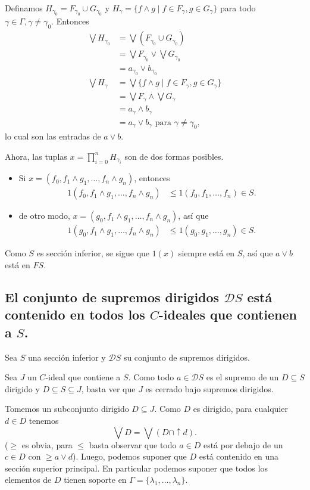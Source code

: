 \documentclass[12pt,letterpaper,titlepage]{article}
\theoremstyle{definition}
\renewcommand\sup{\vee}
\newcommand\Sup{\bigvee}
\renewcommand\inf{\wedge}
\newcommand\D{\mathcal D}
\newcommand\tps[2]{\texorpdfstring{#1}{#2}}
\newcommand\<{\langle}
\renewcommand\>{\rangle}
\begin{document}
Definamos $H_{\gamma_0}=F_{\gamma_0}\cup G_{\gamma_0}$ y
$H_\gamma = \{f\inf g\mid f\in F_\gamma,g\in G_\gamma\}$ para
todo $\gamma\in\Gamma,\gamma\neq\gamma_0$.
Entonces
\begin{align*}
  \Sup H_{\gamma_0}
  &= \Sup(F_{\gamma_0}\cup G_{\gamma_0}) \\
  &= \Sup F_{\gamma_0} \sup \Sup G_{\gamma_0} \\
  &= a_{\gamma_0} \sup b_{\gamma_0}
  \\
  \Sup H_\gamma
  &= \Sup\{f\inf g \mid f\in F_\gamma, g\in G_\gamma\} \\
  &= \Sup F_\gamma \inf \Sup G_\gamma \\
  &= a_\gamma \inf b_\gamma \\
  &= a_\gamma\sup b_\gamma
  \text{ para } \gamma\neq\gamma_0,
\end{align*}
lo cual son las entradas de $a\sup b$.

Ahora, las tuplas $x=\prod_{i=0}^n H_{\gamma_i}$ son de
dos formas posibles.
\begin{itemize}
  \item Si $x=(f_0,f_1\inf g_1,\dots,f_n\inf g_n)$,
  entonces
  \begin{align*}
    1(f_0,f_1\inf g_1,\dots,f_n\inf g_n)
    &\leq 1(f_0,f_1,\dots,f_n) \in S.
  \end{align*}
  \item de otro modo, $x=(g_0,f_1\inf g_1,\dots,f_n\inf g_n)$,
  así que
  \begin{align*}
    1(g_0,f_1\inf g_1,\dots,f_n\inf g_n)
    &\leq 1(g_0,g_1,\dots,g_n)\in S.
  \end{align*}
\end{itemize}
Como $S$ es sección inferior, se sigue que $1(x)$ siempre está en
$S$, así que $a\sup b$ está en $FS$.

\subsection{El conjunto de supremos dirigidos \tps{$\D S$}{DS} está contenido en todos los \tps{$C$}{C}-ideales que contienen a \tps{$S$}{S}.}

Sea $S$ una sección inferior y $\D S$ su conjunto de supremos
dirigidos.

Sea $J$ un $C$-ideal que contiene a $S$.
Como todo $a\in\D S$ es el supremo de un $D\subseteq S$ dirigido
y $D\subseteq S\subseteq J$, basta ver que $J$ es cerrado bajo
supremos dirigidos.

Tomemos un subconjunto dirigido $D\subseteq J$.
Como $D$ es dirigido, para cualquier $d\in D$ tenemos
\[
  \Sup D = \Sup(D\cap{\uparrow}d)
.\]
($\geq$ es obvia, para $\leq$ basta observar que todo $a\in D$
está por debajo de un $c\in D$ con $\geq a\sup d$).
Luego, podemos suponer que $D$ está contenido en una sección
superior principal.
En particular podemos suponer que todos los elementos de $D$
tienen soporte en $\Gamma=\{\lambda_1,\dots,\lambda_n\}$.
\end{document}
